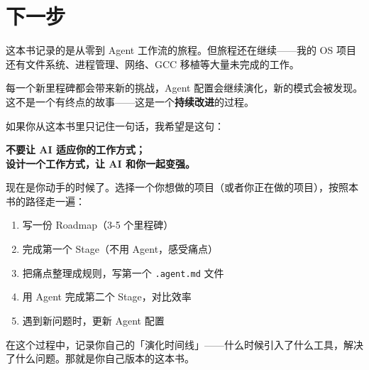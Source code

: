 \section{下一步}

这本书记录的是从零到 Agent 工作流的旅程。但旅程还在继续——我的 OS 项目还有文件系统、进程管理、网络、GCC 移植等大量未完成的工作。

每一个新里程碑都会带来新的挑战，Agent 配置会继续演化，新的模式会被发现。这不是一个有终点的故事——这是一个\textbf{持续改进}的过程。

如果你从这本书里只记住一句话，我希望是这句：

\begin{center}
\Large\bfseries
不要让 AI 适应你的工作方式；\\
设计一个工作方式，让 AI 和你一起变强。
\end{center}

\begin{exercise}
现在是你动手的时候了。选择一个你想做的项目（或者你正在做的项目），按照本书的路径走一遍：
\begin{enumerate}
  \item 写一份 Roadmap（3-5 个里程碑）
  \item 完成第一个 Stage（不用 Agent，感受痛点）
  \item 把痛点整理成规则，写第一个 \texttt{.agent.md} 文件
  \item 用 Agent 完成第二个 Stage，对比效率
  \item 遇到新问题时，更新 Agent 配置
\end{enumerate}
在这个过程中，记录你自己的「演化时间线」——什么时候引入了什么工具，解决了什么问题。那就是你自己版本的这本书。
\end{exercise}
